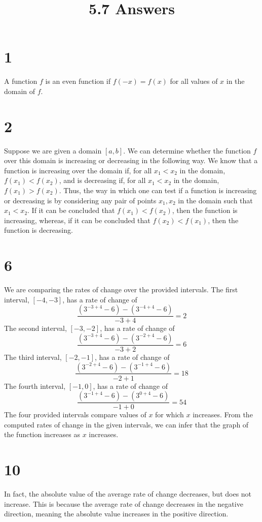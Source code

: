 \documentclass{article}
\title{5.7 Answers}
\theoremstyle{definition}
\newcommand{\?}{\stackrel{?}{=}}
\begin{document}
\maketitle

\section*{1}
A function $f$ is an even function if $f(-x)=f(x)$ for all values of $x$ in the domain of $f$.

\section*{2}
Suppose we are given a domain $[a,b]$. We can determine whether the function $f$ over this domain is increasing or decreasing in the following way. We know that a function is increasing over the domain 
if, for all $x_1<x_2$ in the domain, $f(x_1)<f(x_2)$, and is decreasing if, for all $x_1<x_2$ in the domain, $f(x_1)>f(x_2)$. Thus, the way in which one can test if a function is increasing or decreasing is by 
considering any pair of points $x_1,x_2$ in the domain such that $x_1<x_2$. If it can be concluded that $f(x_1)<f(x_2)$, then the function is increasing, whereas, if it can be concluded that 
$f(x_2)<f(x_1)$, then the function is decreasing.

\section*{6}
We are comparing the rates of change over the provided intervals. The first interval, $[-4,-3]$, has a rate of change of \[ \dfrac{(3^{-3+4}-6)-(3^{-4+4}-6)}{-3+4}=2 \] The second 
interval, $[-3,-2]$, has a rate of change of \[ \dfrac{(3^{-3+4}-6)-(3^{-2+4}-6)}{-3+2}=6 \] The third interval, $[-2,-1]$, has a rate of change of
\[ \dfrac{(3^{-2+4}-6)-(3^{-1+4}-6)}{-2+1}=18 \] The fourth interval, $[-1,0]$, has a rate of change of
\[ \dfrac{(3^{-1+4}-6)-(3^{0+4}-6)}{-1+0}=54 \] The four provided intervals compare values of $x$ for which $x$ increases. From the computed rates of change in the given intervals, we can infer that the graph of the function 
increases as $x$ increases.

\section*{10}
In fact, the absolute value of the average rate of change decreases, but does not increase. This is because the average rate of change decreases in the negative direction, 
meaning the absolute value increases in the positive direction.
\end{document}
